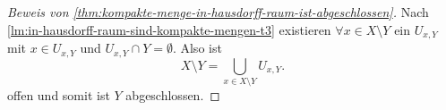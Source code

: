 \begin{proof}[Beweis von \autoref{thm:kompakte-menge-in-hausdorff-raum-ist-abgeschlossen}]
    Nach \autoref{lm:in-hausdorff-raum-sind-kompakte-mengen-t3} existieren $\forall x\in X \setminus Y$ ein $U_{x,Y}$ mit $x\in U_{x,Y}$ und $U_{x,Y} \cap Y = \emptyset$. Also ist
    \[
    X \setminus Y = \bigcup_{x\in X \setminus Y} U_{x,Y}
    .\] 
    offen und somit ist $Y$ abgeschlossen.
\end{proof}

